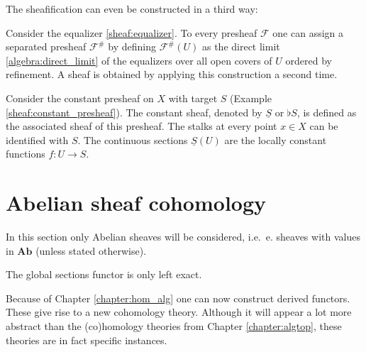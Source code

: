 
    The sheafification can even be constructed in a third way:
    \begin{construct}\label{sheaf:colimit_construction}
        Consider the equalizer \eqref{sheaf:equalizer}. To every presheaf $\mathcal{F}$ one can assign a separated presheaf $\mathcal{F}^\#$ by defining $\mathcal{F}^\#(U)$ as the direct limit \ref{algebra:direct_limit} of the equalizers over all open covers of $U$ ordered by refinement. A sheaf is obtained by applying this construction a second time.
    \end{construct}

    \begin{example}\label{sheaf:constant_sheaf}
        Consider the constant presheaf on $X$ with target $S$ (Example \ref{sheaf:constant_presheaf}). The constant sheaf, denoted by $\underline{S}$ or $\flat S$, is defined as the associated sheaf of this presheaf. The stalks at every point $x\in X$ can be identified with $S$. The continuous sections $\underline{S}(U)$ are the locally constant functions $f:U\rightarrow S$.
    \end{example}

\section{Abelian sheaf cohomology}

    In this section only Abelian sheaves will be considered, i.e.~e. sheaves with values in $\mathbf{Ab}$ (unless stated otherwise).

    \begin{property}\label{sheaf:left_exact_functor}
        The global sections functor is only left exact.
    \end{property}

    Because of Chapter \ref{chapter:hom_alg} one can now construct derived functors. These give rise to a new cohomology theory. Although it will appear a lot more abstract than the (co)homology theories from Chapter \ref{chapter:algtop}, these theories are in fact specific instances.

